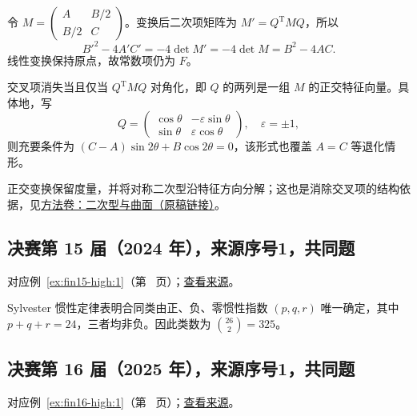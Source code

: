 \documentclass[UTF8,12pt,a4paper,fontset=fandol]{ctexart}
\begin{document}
\begin{solve}

令 $M=\begin{pmatrix}A&B/2\\B/2&C\end{pmatrix}$。变换后二次项矩阵为 $M'=Q^{\mathrm T}MQ$，所以
\[
B'^2-4A'C'=-4\det M'=-4\det M=B^2-4AC.
\]
线性变换保持原点，故常数项仍为 $F$。

交叉项消失当且仅当 $Q^{\mathrm T}MQ$ 对角化，即 $Q$ 的两列是一组 $M$ 的正交特征向量。具体地，写
\[
Q=\begin{pmatrix}\cos\theta&-\varepsilon\sin\theta\\
\sin\theta&\varepsilon\cos\theta\end{pmatrix},\quad\varepsilon=\pm1,
\]
则充要条件为 $\boxed{(C-A)\sin2\theta+B\cos2\theta=0}$，该形式也覆盖 $A=C$ 等退化情形。

正交变换保留度量，并将对称二次型沿特征方向分解；这也是消除交叉项的结构依据，见\href{https://github.com/lzxcr/cmc-mathematics/blob/64916fa1fdbc3e444a652eca204d5669058ee321/src/methods/outer/02-geometry.md}{方法卷：二次型与曲面（原稿链接）}。

\end{solve}

\subsection{决赛第 15 届（2024 年），来源序号1，共同题}\label{ans:fin15-high:1}\label{pr:fin15-high:1}

对应例~\ref{ex:fin15-high:1}（第~\pageref{ex:fin15-high:1} 页）；\href{https://github.com/lzxcr/cmc-mathematics/blob/64916fa1fdbc3e444a652eca204d5669058ee321/src/problems/finals/15/01.md}{查看来源}。

\begin{solve}

Sylvester 惯性定律表明合同类由正、负、零惯性指数 $(p,q,r)$ 唯一确定，其中 $p+q+r=24$，三者均非负。因此类数为 $\boxed{\binom{26}{2}=325}$。

\end{solve}

\subsection{决赛第 16 届（2025 年），来源序号1，共同题}\label{ans:fin16-high:1}\label{pr:fin16-high:1}

对应例~\ref{ex:fin16-high:1}（第~\pageref{ex:fin16-high:1} 页）；\href{https://github.com/lzxcr/cmc-mathematics/blob/64916fa1fdbc3e444a652eca204d5669058ee321/src/problems/finals/16/01.md}{查看来源}。
\end{document}
